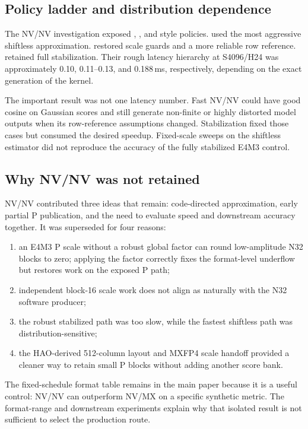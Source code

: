 \subsection{Policy ladder and distribution dependence}

The NV/NV investigation exposed , , and
 style policies.  used the most aggressive
shiftless approximation.  restored scale guards and a more
reliable row reference.  retained full stabilization. Their
rough latency hierarchy at S4096/H24 was approximately 0.10, 0.11--0.13,
and 0.188\,ms, respectively, depending on the exact generation of the
kernel.

The important result was not one latency number. Fast NV/NV could have good
cosine on Gaussian scores and still generate non-finite or highly distorted
model outputs when its row-reference assumptions changed. Stabilization
fixed those cases but consumed the desired speedup. Fixed-scale sweeps on
the shiftless estimator did not reproduce the accuracy of the fully
stabilized E4M3 control.

\subsection{Why NV/NV was not retained}

NV/NV contributed three ideas that remain: code-directed approximation,
early partial P publication, and the need to evaluate speed and downstream
accuracy together. It was superseded for four reasons:
\begin{enumerate}
  \item an E4M3 P scale without a robust global factor can round
  low-amplitude N32 blocks to zero; applying the factor correctly fixes the
  format-level underflow but restores work on the exposed P path;
  \item independent block-16 scale work does not align as naturally with the
  N32 software producer;
  \item the robust stabilized path was too slow, while the fastest shiftless
  path was distribution-sensitive;
  \item the HAO-derived 512-column layout and MXFP4 scale handoff provided a
  cleaner way to retain small P blocks without adding another score bank.
\end{enumerate}

The fixed-schedule format table remains in the main paper because it is a useful
control: NV/NV can outperform NV/MX on a specific synthetic metric. The
format-range and downstream experiments explain why that isolated result is
not sufficient to select the production route.

